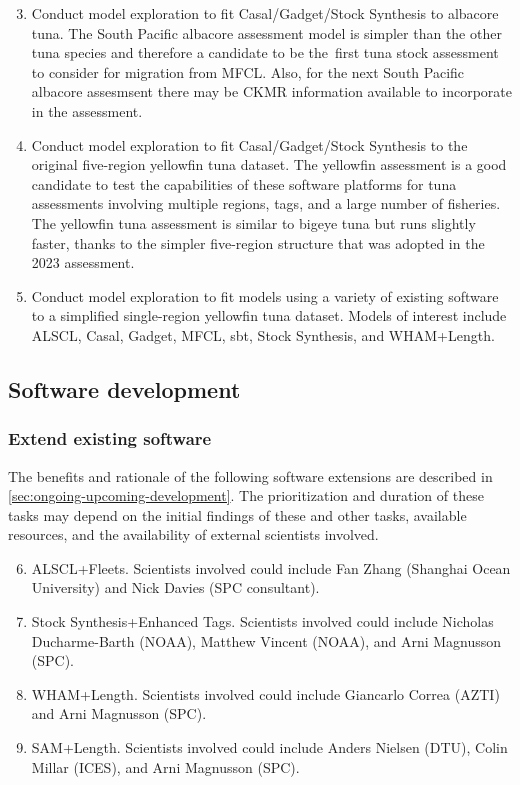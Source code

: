 \documentclass{SCreport}
\begin{document}
\begin{enumerate}\setcounter{enumi}{2}
  \item Conduct model exploration to fit Casal/Gadget/Stock Synthesis to
  albacore tuna. The South Pacific albacore assessment model is simpler than the
  other tuna species and therefore a candidate to be the~first tuna stock
  assessment to consider for migration from MFCL. Also, for the next South
  Pacific albacore assesmsent there may be CKMR information available to
  incorporate in the assessment.
  \item Conduct model exploration to fit Casal/Gadget/Stock Synthesis to the
  original five-region yellowfin tuna dataset. The yellowfin assessment is a
  good candidate to test the capabilities of these software platforms for tuna
  assessments involving multiple regions, tags, and a large number of fisheries.
  The yellowfin tuna assessment is similar to bigeye tuna but runs slightly
  faster, thanks to the simpler \mbox{five-region} structure that was adopted in
  the 2023 assessment.
  \item Conduct model exploration to fit models using a variety of existing
  software to a simplified single-region yellowfin tuna dataset. Models of
  interest include ALSCL, Casal, Gadget, MFCL, sbt, Stock Synthesis, and
  WHAM+Length.
\end{enumerate}

\subsection{Software development}

\subsubsection{Extend existing software}

The benefits and rationale of the following software extensions are described in
\autoref{sec:ongoing-upcoming-development}. The prioritization and duration of
these tasks may depend on the initial findings of these and other tasks,
available resources, and the availability of external scientists involved.

\begin{enumerate}\setcounter{enumi}{5}
  \item ALSCL+Fleets. Scientists involved could include Fan Zhang (Shanghai
  Ocean University) and Nick Davies (SPC consultant).
  \item Stock Synthesis+Enhanced Tags. Scientists involved could include
  Nicholas Ducharme-Barth (NOAA), Matthew Vincent (NOAA), and Arni Magnusson
  (SPC).
  \item WHAM+Length. Scientists involved could include Giancarlo Correa (AZTI)
  and Arni Magnusson (SPC).
  \item SAM+Length. Scientists involved could include Anders Nielsen (DTU),
  Colin Millar (ICES), and Arni Magnusson (SPC).
\end{enumerate}
\end{document}
